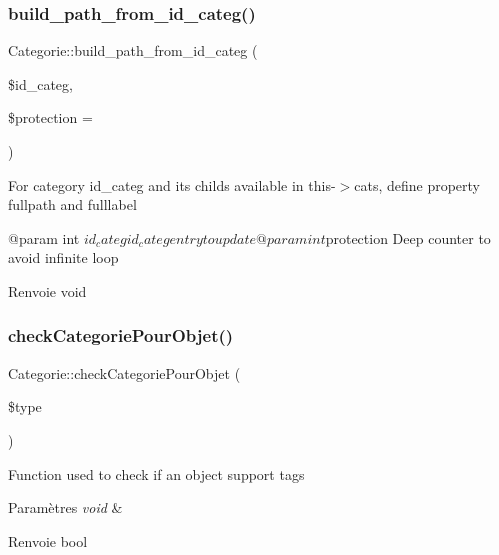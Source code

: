 \subsubsection{\texorpdfstring{build\+\_\+path\+\_\+from\+\_\+id\+\_\+categ()}{build\_path\_from\_id\_categ()}}
{\footnotesize\ttfamily Categorie\+::build\+\_\+path\+\_\+from\+\_\+id\+\_\+categ (\begin{DoxyParamCaption}\item[{}]{\$id\+\_\+categ,  }\item[{}]{\$protection = {} }\end{DoxyParamCaption})}

For category id\+\_\+categ and its childs available in this-\/$>$cats, define property fullpath and fulllabel \begin{DoxyVerb}@param      int     $id_categ       id_categ entry to update
@param      int     $protection     Deep counter to avoid infinite loop
\end{DoxyVerb}
 \begin{DoxyReturn}{Renvoie}
void 
\end{DoxyReturn}
\mbox{\label{classCategorie_a30698fd26c01a2a205d5c987fe5d6c7f}} 
\subsubsection{\texorpdfstring{check\+Categorie\+Pour\+Objet()}{checkCategoriePourObjet()}}
{\footnotesize\ttfamily Categorie\+::check\+Categorie\+Pour\+Objet (\begin{DoxyParamCaption}\item[{}]{\$type }\end{DoxyParamCaption})}

Function used to check if an object support tags


\begin{DoxyParams}{Paramètres}
{\em void} & \\
\hline
\end{DoxyParams}
\begin{DoxyReturn}{Renvoie}
bool 
\end{DoxyReturn}
\mbox{\label{classCategorie_a426051910036f20087478d0571669bf8}} 

